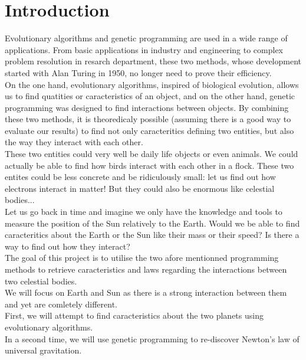 \section{Introduction}
\indent
Evolutionary algorithms and genetic programming are used in a wide range of applications. From basic applications in industry and engineering to complex problem resolution in resarch department, these two methods, whose development started with Alan Turing in 1950, no longer need to prove their efficiency.\\


On the one hand, evolutionary algorithms, inspired of biological evolution, allows us to find quatities or caracteristics of an object, and on the other hand, genetic programming was designed to find interactions between objects. By combining these two methods, it is theoredicaly possible (assuming there is a good way to evaluate our results) to find not only caracteritics defining two entities, but also the way they interact with each other.\\
These two entities could very well be daily life objects or even animals. We could actually be able to find how birds interact with each other in a flock. These two entites could be less concrete and be ridiculously small: let us find out how electrons interact in matter! But they could also be enormous like celestial bodies...\\

Let us go back in time and imagine we only have the knowledge and tools to measure the position of the Sun relatively to the Earth. Would we be able to find caracteritics about the Earth or the Sun like their mass or their speed? Is there a way to find out how they interact?\\

The goal of this project is to utilise the two afore mentionned programming methods to retrieve caracteristics and laws regarding the interactions between two celestial bodies.\\
We will focus on Earth and Sun as there is a strong interaction between them and yet are comletely different.\\
First, we will attempt to find caracteristics about the two planets using evolutionary algorithms.\\
In a second time, we will use genetic programming to re-discover Newton's law of universal gravitation.

